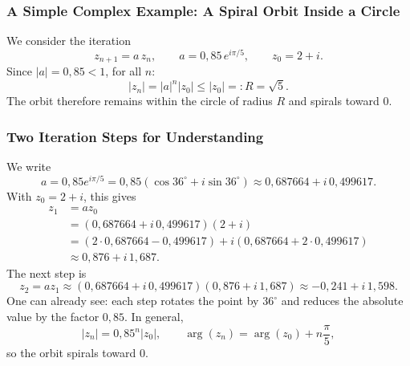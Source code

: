 \subsubsection*{A Simple Complex Example: A Spiral Orbit Inside a Circle}

We consider the iteration
\[
z_{n+1}=a\,z_n,\qquad a=0{,}85\,e^{i\pi/5},\qquad z_0=2+i.
\]
Since $|a|=0{,}85<1$, for all $n$:
\[
|z_n|=|a|^n|z_0|\le |z_0|=:R=\sqrt{5}.
\]
The orbit therefore remains within the circle of radius $R$ and spirals toward $0$.

\subsubsection*{Two Iteration Steps for Understanding}

We write
\[
a=0{,}85e^{i\pi/5}=0{,}85(\cos36^\circ+i\sin36^\circ)
\approx 0{,}687664+i\,0{,}499617.
\]
With $z_0=2+i$, this gives
\begin{align*}
	z_1 &= a z_0\\
	&= (0{,}687664+i\,0{,}499617)(2+i)\\
	&= (2\cdot0{,}687664-0{,}499617)+i(0{,}687664+2\cdot0{,}499617)\\
	&\approx 0{,}876+i\,1{,}687.
\end{align*}
The next step is
\[
z_2=a z_1\approx (0{,}687664+i\,0{,}499617)(0{,}876+i\,1{,}687)
\approx -0{,}241+i\,1{,}598.
\]
One can already see:
each step rotates the point by $36^\circ$ and reduces the absolute value by the factor $0{,}85$.
In general,
\[
|z_n|=0{,}85^n|z_0|,\qquad \arg(z_n)=\arg(z_0)+n\frac{\pi}{5},
\]
so the orbit spirals toward $0$.

\begin{figure}[h]
	\centering
\end{figure}

